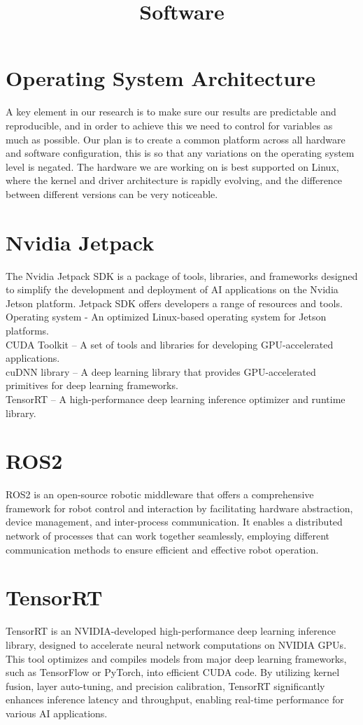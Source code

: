 \title{Software}

\section{Operating System Architecture}
A key element in our research is to make sure our results are predictable and reproducible, and in order to achieve this we need to control for variables as much as possible. Our plan is to create a common platform across all hardware and software configuration, this is so that any variations on the operating system level is negated. 
The hardware we are working on is best supported on Linux, where the kernel and driver architecture is rapidly evolving, and the difference between different versions can be very noticeable.

\section{Nvidia Jetpack}
The Nvidia Jetpack SDK is a package of tools, libraries, and frameworks designed to simplify the development and deployment of AI applications on the Nvidia Jetson platform. Jetpack SDK offers developers a range of resources and tools.
\\
Operating system - An optimized Linux-based operating system for Jetson platforms.
\\
CUDA Toolkit – A set of tools and libraries for developing GPU-accelerated applications.
\\
cuDNN library – A deep learning library that provides GPU-accelerated primitives for deep learning frameworks.
\\
TensorRT – A high-performance deep learning inference optimizer and runtime library.

\section{ROS2}
ROS2 is an open-source robotic middleware that offers a comprehensive framework for robot control and interaction by facilitating hardware abstraction, device management, and inter-process communication. It enables a distributed network of processes that can work together seamlessly, employing different communication methods to ensure efficient and effective robot operation. 

\section{TensorRT}
TensorRT is an NVIDIA-developed high-performance deep learning inference library, designed to accelerate neural network computations on NVIDIA GPUs. This tool optimizes and compiles models from major deep learning frameworks, such as TensorFlow or PyTorch, into eﬀicient CUDA code. By utilizing kernel fusion, layer auto-tuning, and precision calibration, TensorRT significantly enhances inference latency and throughput, enabling real-time performance for various AI applications.

